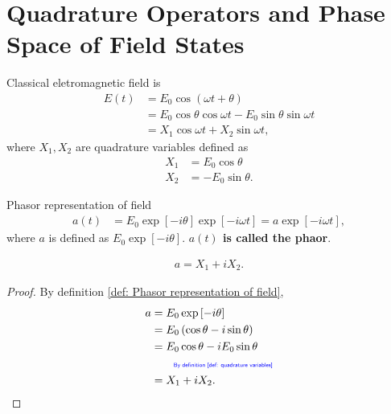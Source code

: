 \documentclass[../../note.tex]{subfiles}
\begin{document}
\section{Quadrature Operators and Phase Space of Field States}

\begin{definition}
    \label{def: quadrature variables}
    Classical eletromagnetic field is
    \begin{align}
        E(t)
        &= E_0 \cos\left(\omega t + \theta \right) \\
        &= E_0 \cos \theta \cos \omega t - E_0 \sin \theta \sin \omega t \\
        &= X_1 \cos \omega t + X_2 \sin \omega t,
    \end{align}
    where $X_1, X_2$ are quadrature variables defined as
    \begin{align}
        X_1
        &= E_0 \cos \theta \\
        X_2
        &= - E_0 \sin \theta.
    \end{align}
\end{definition}

\begin{definition}
    \label{def: Phasor representation of field}
    Phasor representation of field
    \begin{align}
        a(t)
        &= E_0 \exp\left[-i \theta\right] \exp\left[-i \omega t\right] = a \exp\left[-i \omega t\right],
    \end{align}
    where $a$ is defined as $E_0 \exp\left[-i \theta\right]$. \textbf{$a(t)$ is called the phaor}.
\end{definition}

\begin{lemma}
    \label{lemma: Relations between the Phasor representation and quadrature variables}
    \begin{align}
        a = X_1 + i X_2.
    \end{align}
\end{lemma}
\begin{proof}
    By definition \ref{def: Phasor representation of field},
    \begin{align}
        a 
        &= E_0 \exp\left[-i \theta\right] \\
        &= E_0 \left(\cos \theta - i \sin \theta \right) \\
        &= E_0 \cos \theta - i E_0 \sin \theta \\
        &\qquad\text{\color{blue}{\tiny\sffamily By definition \ref{def: quadrature variables}}} \nonumber \\
        &= X_1 + i X_2.
    \end{align}
\end{proof}
\end{document}
